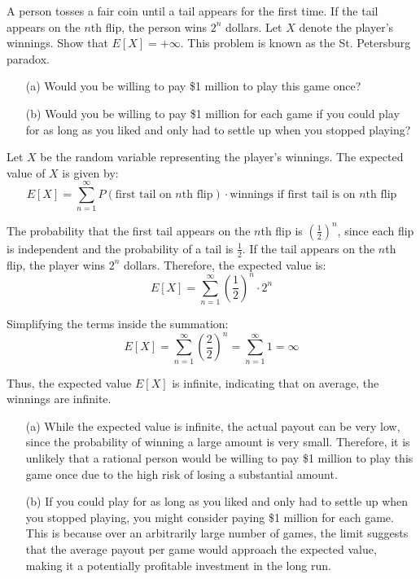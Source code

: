 \begin{exercise}
A person tosses a fair coin until a tail appears for the first time. If the tail appears on the $n$th flip, the person wins $2^n$ dollars. Let $X$ denote the player's winnings. Show that $E[X] = +\infty$. This problem is known as the St. Petersburg paradox.

\begin{enumerate}
    \item[(a)] Would you be willing to pay \$1 million to play this game once?
    \item[(b)] Would you be willing to pay \$1 million for each game if you could play for as long as you liked and only had to settle up when you stopped playing?
\end{enumerate}
\end{exercise}

\begin{solution}
Let $X$ be the random variable representing the player's winnings. The expected value of $X$ is given by:
\[
E[X] = \sum_{n=1}^{\infty} P(\text{first tail on } n\text{th flip}) \cdot \text{winnings if first tail is on } n\text{th flip}
\]

The probability that the first tail appears on the $n$th flip is $\left(\frac{1}{2}\right)^n$, since each flip is independent and the probability of a tail is $\frac{1}{2}$. If the tail appears on the $n$th flip, the player wins $2^n$ dollars. Therefore, the expected value is:
\[
E[X] = \sum_{n=1}^{\infty} \left(\frac{1}{2}\right)^n \cdot 2^n
\]

Simplifying the terms inside the summation:
\[
E[X] = \sum_{n=1}^{\infty} \left(\frac{2}{2}\right)^n = \sum_{n=1}^{\infty} 1 = \infty
\]

Thus, the expected value $E[X]$ is infinite, indicating that on average, the winnings are infinite.

\begin{enumerate}
    \item[(a)] While the expected value is infinite, the actual payout can be very low, since the probability of winning a large amount is very small. Therefore, it is unlikely that a rational person would be willing to pay \$1 million to play this game once due to the high risk of losing a substantial amount.
    \item[(b)] If you could play for as long as you liked and only had to settle up when you stopped playing, you might consider paying \$1 million for each game. This is because over an arbitrarily large number of games, the limit suggests that the average payout per game would approach the expected value, making it a potentially profitable investment in the long run.
\end{enumerate}
\end{solution}

